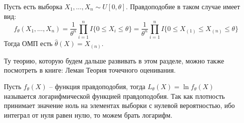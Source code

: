 \begin{example}
    Пусть есть выборка $X_1, \dots, X_n \sim U[0, \theta]$. Правдоподобие в таком случае имеет вид:
    \[
        f_\theta(X_1, \dots, X_n) = \frac{1}{\theta^n} \prod_{i=1}^n I\{0 \le X_i \le \theta\} = \frac{1}{\theta^n} \prod_{i=1}^n I\{0 \le X_{(1)} \le X_{(n)} \le \theta\}
    \]
    Тогда ОМП есть $\hat{\theta}(X) = X_{(n)}$.
\end{example}

\begin{note}
    Ту теорию, которую будем дальше развивать в этом разделе, можно также посмотреть в книге: Леман Теория точечного оценивания.
\end{note}

\begin{definition}
    Пусть $f_\theta(X)$ -- функция правдоподобия, тогда $L_\theta(X) = \ln f_\theta(X)$ называется логарифмической функцией правдоподобия. Так как плотность принимает значение ноль на элементах выборки с нулевой вероятностью, ибо интеграл от нуля равен нулю, то можем брать логарифм.
\end{definition}

